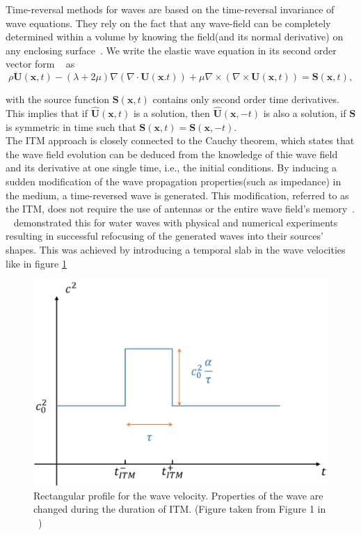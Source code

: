 Time-reversal methods for waves are based on the time-reversal invariance of wave equations. They rely on the fact that any wave-field can be completely determined within
a volume by knowing the field(and its normal derivative) on any enclosing surface~\parencite{Bacot2016}. We write the elastic wave equation in its second order vector form
~\parencite[Cha. 2]{aki2002quantitative} as
\begin{equation}
    \rho \ddot{\mathbf{U}} \left( \mathbf{x}, t\right) - \left( \lambda + 2 \mu \right) \nabla \left(\nabla \cdot \mathbf{U}\left(\mathbf{x}. t\right)\right) 
    + \mu \nabla \times \left(\nabla \times \mathbf{U}\left(\mathbf{x},t\right)\right) = \mathbf{S}\left(\mathbf{x},t\right),
\end{equation}

with the source function $\mathbf{S}\left(\mathbf{x},t\right)$ contains only second order time derivatives. This implies that if $\hat{\mathbf{U}}\left(\mathbf{x},t\right)$
is a solution, then $\hat{\mathbf{U}}\left(\mathbf{x}, -t\right)$ is also a solution, if $\mathbf{S}$ is symmetric in time such that 
$\mathbf{S}\left(\mathbf{x}, t\right) = \mathbf{S}\left(\mathbf{x}, -t\right)$. \\

The \ac{ITM} approach is closely connected to the Cauchy theorem, which states that the wave field evolution can be deduced from the knowledge of thie wave field
and its derivative at one single time, i.e., the initial conditions. By inducing a sudden modification of the wave propagation properties(such as impedance) in the
medium, a time-reversed wave is generated. This modification, referred to as the \ac{ITM}, does not require the use of antennas or the entire wave field's memory~\parencite{Bacot2016}.
~\parencite{Bacot2016} demonstrated this for water waves with physical and numerical experiments resulting in successful refocusing of the generated waves into their
sources' shapes. This was achieved by introducing a temporal slab in the wave velocities like in figure \ref{fig:deltavelocity}

\begin{figure}
    \centering
    \includegraphics[width=0.6\linewidth]{figures/delta_speed.png}
    \caption{Rectangular profile for the wave velocity. Properties of the wave are changed during the duration of \ac{ITM}. (Figure taken from Figure 1 in ~\parencite[Supplementary Material]{Bacot2016})}
    \label{fig:deltavelocity}
\end{figure}

